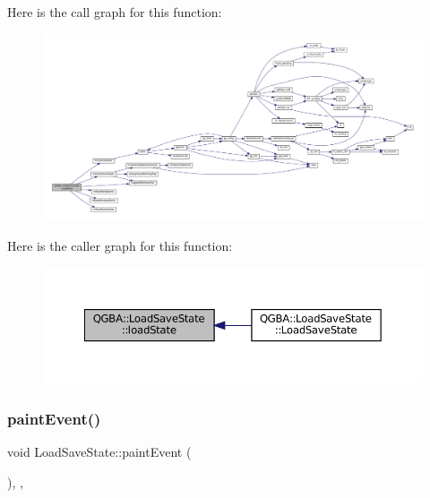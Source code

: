 Here is the call graph for this function\+:
\nopagebreak
\begin{figure}[H]
\begin{center}
\leavevmode
\includegraphics[width=350pt]{class_q_g_b_a_1_1_load_save_state_a4c71c3b9021b90dc593df29b6aab1676_cgraph}
\end{center}
\end{figure}
Here is the caller graph for this function\+:
\nopagebreak
\begin{figure}[H]
\begin{center}
\leavevmode
\includegraphics[width=350pt]{class_q_g_b_a_1_1_load_save_state_a4c71c3b9021b90dc593df29b6aab1676_icgraph}
\end{center}
\end{figure}
\mbox{\label{class_q_g_b_a_1_1_load_save_state_afabd75e99d746a814ab373cf4dd1e42f}} 
\subsubsection{\texorpdfstring{paint\+Event()}{paintEvent()}}
{\footnotesize\ttfamily void Load\+Save\+State\+::paint\+Event (\begin{DoxyParamCaption}\item[{Q\+Paint\+Event $\ast$}]{ }\end{DoxyParamCaption})\hspace{0.3cm}{\ttfamily [override]}, {\ttfamily [protected]}, {\ttfamily [virtual]}}

